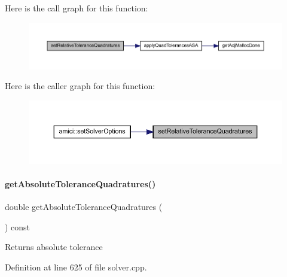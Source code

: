 Here is the call graph for this function\+:
\nopagebreak
\begin{figure}[H]
\begin{center}
\leavevmode
\includegraphics[width=350pt]{classamici_1_1_solver_a086428d30274f2b7e6f94e8e7593dd8b_cgraph}
\end{center}
\end{figure}
Here is the caller graph for this function\+:
\nopagebreak
\begin{figure}[H]
\begin{center}
\leavevmode
\includegraphics[width=350pt]{classamici_1_1_solver_a086428d30274f2b7e6f94e8e7593dd8b_icgraph}
\end{center}
\end{figure}
\mbox{\label{classamici_1_1_solver_a1f50a4e21784c2757530068483c405cb}} 
\paragraph{\texorpdfstring{getAbsoluteToleranceQuadratures()}{getAbsoluteToleranceQuadratures()}}
{\footnotesize\ttfamily double get\+Absolute\+Tolerance\+Quadratures (\begin{DoxyParamCaption}{ }\end{DoxyParamCaption}) const}

\begin{DoxyReturn}{Returns}
absolute tolerance 
\end{DoxyReturn}


Definition at line 625 of file solver.\+cpp.

\mbox{\label{classamici_1_1_solver_af425163c5d98c472d17e080da4ee3b78}} 
